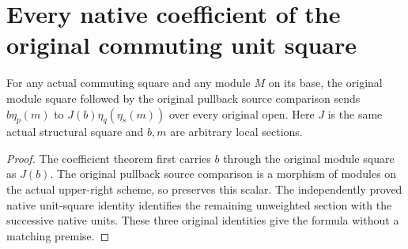 \section{Every native coefficient of the original commuting unit square}

\begin{lemma}
\label{lem:kn-native-module-square-weighted-unit}
\leanok
For any actual commuting square and any module $M$ on its base, the
original module square followed by the original pullback source
comparison sends $b\eta_p(m)$ to
$J(b)\eta_q(\eta_s(m))$ over every original open. Here $J$ is the
same actual structural square and $b,m$ are arbitrary local sections.
\end{lemma}
\begin{proof}
The coefficient theorem first carries $b$ through the original module
square as $J(b)$. The original pullback source comparison is a morphism
of modules on the actual upper-right scheme, so preserves this scalar.
The independently proved native unit-square identity identifies the
remaining unweighted section with the successive native units. These
three original identities give the formula without a matching premise.
\end{proof}
